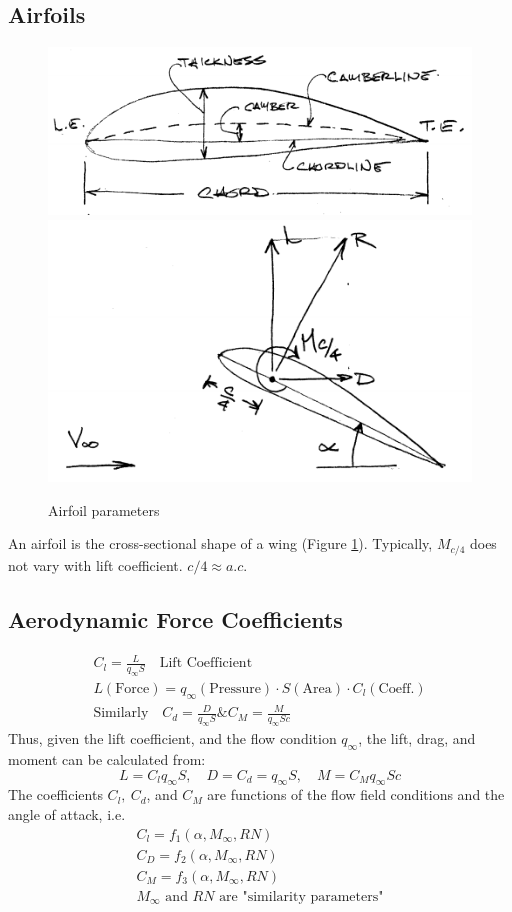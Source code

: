 \documentclass[draft=false, titlepage]{article}
\begin{document}
\subsection{Airfoils}
\begin{figure}[ht]
	\centering
	\includegraphics[width=0.5\linewidth]{Figures/p38_airfoils1.PNG}
	\includegraphics[width=0.4\linewidth]{Figures/p38_airfoils2.PNG}
	\caption{Airfoil parameters}
	\label{fig:p38_airfoils}
\end{figure}
An airfoil is the cross-sectional shape of a wing (Figure \ref{fig:p38_airfoils}). Typically, $M_{c/4}$ does not vary with lift coefficient. $\boxed{c/4 \approx a.c.}$

\subsection{Aerodynamic Force Coefficients}
\begin{gather*}
C_l = \frac{L}{q_\infty S} \quad \text{Lift Coefficient}\\
L (\text{Force}) = q_\infty (\text{Pressure}) \cdot S (\text{Area}) \cdot C_l (\text{Coeff.})\\
\text{Similarly} \quad C_d = \frac{D}{q_\infty S} \& C_M = \frac{M}{q_\infty Sc}
\end{gather*}
Thus, given the lift coefficient, and the flow condition $q_\infty$, the lift, drag, and moment can be calculated from:
\begin{equation}
L = C_l q_\infty S,\quad D = C_d = q_\infty S,\quad M = C_M q_\infty Sc
\end{equation}
The coefficients $C_l,\ C_d$, and $C_M$ are functions of the flow field conditions and the angle of attack, i.e.
\begin{gather*}
C_l = f_1(\alpha, M_\infty, RN)\\
C_D = f_2(\alpha, M_\infty, RN)\\
C_M = f_3(\alpha, M_\infty, RN)\\
M_\infty \text{ and } RN \text{ are "similarity parameters"}
\end{gather*}
\end{document}
